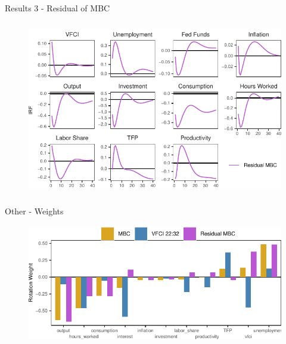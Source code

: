 \begin{frame}{Results 3 - Residual of MBC }
    
    \label{results-3}

    \vspace{-0.25cm}

    \begin{figure}
        \includegraphics[height = 3in]{figs/fig6_resid_MBC.pdf}
    \end{figure}
    

\end{frame}


\begin{frame}{Other - Weights }
    
    \vspace{-0.25cm}
    
    \begin{figure}
        \includegraphics[height = 2in]{figs/fig7_weights.pdf}
    \end{figure}

\end{frame}


